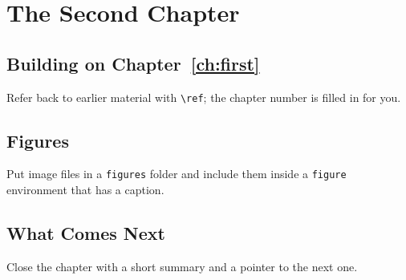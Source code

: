 \chapter{The Second Chapter}\label{ch:second}

\section{Building on Chapter~\ref{ch:first}}
Refer back to earlier material with \verb|\ref|; the chapter number is filled in for you.

\section{Figures}
Put image files in a \texttt{figures} folder and include them
inside a \texttt{figure} environment that has a caption.

\section{What Comes Next}
Close the chapter with a short summary and a pointer to the next one.
